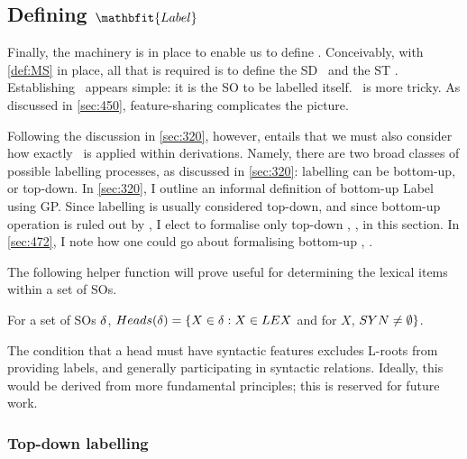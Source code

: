\subsection[Defining \Label]{Defining $\mathbfit{\Label}$}\label{sec:470}

Finally, the machinery is in place to enable us to define \Label. Conceivably, with \autoref{def:MS} in place, all that is required is to define the SD \SD\ and the ST \ST. Establishing \SD\ appears simple: it is the SO to be labelled itself. \ST\ is more tricky. As discussed in \autoref{sec:450}, feature-sharing complicates the picture.

Following the discussion in \autoref{sec:320}, however, entails that we must also consider how exactly \Label\ is applied within derivations. Namely, there are two broad classes of possible labelling processes, as discussed in \autoref{sec:320}: labelling can be bottom-up, or top-down. In \autoref{sec:320}, I outline an informal definition of bottom-up Label using GP. Since labelling is usually considered top-down, and since bottom-up operation is ruled out by \textcite{KeH_2019,AdgerD.RobertsI_}, I elect to formalise only top-down \Label, \LabelTD, in this section. In \autoref{sec:472}, I note how one could go about formalising bottom-up \Label, \LabelBU.

The following helper function will prove useful for determining the lexical items within a set of SOs.

\begin{definition}
    For a set of SOs $\delta$, $Heads(\delta) = \{X \in \delta : X \in LEX$ and for $X$, $SYN \neq \emptyset\}$.
\end{definition}

The condition that a head must have syntactic features excludes L-roots from providing labels, and generally participating in syntactic relations. Ideally, this would be derived from more fundamental principles; this is reserved for future work.

\subsubsection{Top-down labelling}\label{sec:471}

